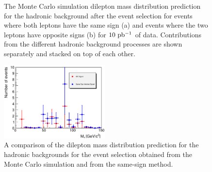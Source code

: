 \documentclass{cmspaper}
\begin{document}
\begin{figure}[htb]
  \begin{center}
    \caption{The Monte Carlo simulation dilepton mass distribution prediction for the hadronic background after the \Z\To\Ep\Em event selection for events where both leptons have the same sign (a) and events where the two leptons have opposite signs (b) for $10\ \ipb$ of data. Contributions from the different hadronic background processes are shown separately and stacked on top of each other.}
    \label{zeeDileptonMass_HadBkg_Stack}
  \end{center}
\end{figure}


\begin{figure}[htb]
  \begin{center}
    \includegraphics[width=0.49\textwidth]{plots/zeeDileptonMass_HadBkg_MCVsSSMethod.eps} 
    \caption{A comparison of the dilepton mass distribution prediction for the hadronic backgrounds for the \Z\To\Ep\Em event selection obtained from the Monte Carlo simulation and from the same-sign method. }
    \label{zeeDileptonMass_HadBkg_MCVsSSMethod}
  \end{center}
\end{figure}
\end{document}
